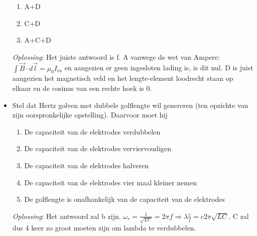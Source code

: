 \documentclass[12pt,a4paper]{article}
\begin{document}
\begin{itemize}
\begin{enumerate}[label=\alph*]
    		\item A+D
    		\item C+D
    		\item A+C+D
    	\end{enumerate}
    	\textit{Oplossing}: Het juiste antwoord is f. A vanwege de wet van Ampere: \(\int\vec{B}\cdot d\vec{l} = \mu_0I_{in}\) en aangezien er geen ingesloten lading is, is dit nul. D is juist aangezien het magnetisch veld en het lengte-element loodrecht staan op elkaar en de cosinus van een rechte hoek is 0.
    	\item Stel dat Hertz golven met dubbele golflengte wil genereren (ten opzichte van zijn oorspronkelijke opstelling). Daarvoor moet hij
    	\begin{enumerate}[label=\alph*]
    		\item De capaciteit van de elektrodes verdubbelen
    		\item De capaciteit van de elektrodes verviervoudigen
    		\item De capaciteit van de elektrodes halveren
    		\item De capaciteit van de elektrodes vier maal kleiner nemen
    		\item De golflengte is onafhankelijk van de capaciteit van de elektrodes
    	\end{enumerate}
    	\textit{Oplossing}: Het antwoord zal b zijn. \(\omega_r = \frac{1}{\sqrt{LC}} = 2\pi f \Rightarrow \lambda\frac{c}{f} = c2\pi\sqrt{LC}\). C zal dus 4 keer zo groot moeten zijn om lambda te verdubbelen. 
    \end{itemize}
\end{document}
